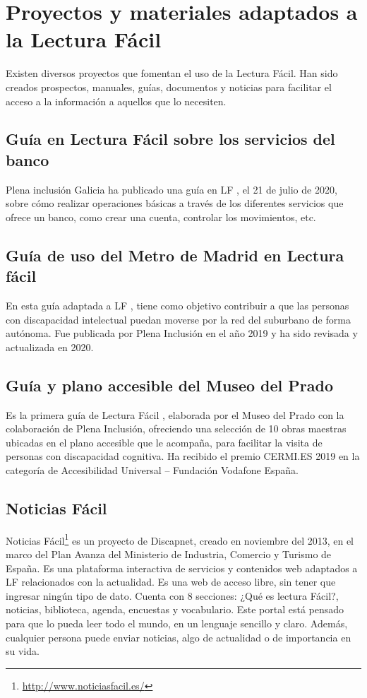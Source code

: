 \section{Proyectos y materiales adaptados a la Lectura Fácil}

Existen diversos proyectos que fomentan el uso de la Lectura Fácil. Han sido creados prospectos, manuales, guías, documentos y noticias para facilitar el acceso a la información a aquellos que lo necesiten. 


\subsection{Guía en Lectura Fácil sobre los servicios del banco}



Plena inclusión Galicia ha publicado una guía en LF \citep{GuiaBanco}, el 21 de julio de 2020, sobre cómo realizar operaciones básicas a través de los diferentes servicios que ofrece un banco, como crear una cuenta, controlar los movimientos, etc.

\subsection{Guía de uso del Metro de Madrid en Lectura fácil}


En esta guía adaptada a LF \citep{GuiaMetro}, tiene como objetivo contribuir a que las personas con discapacidad intelectual puedan moverse por la red del suburbano de forma autónoma. Fue publicada por Plena Inclusión en el año 2019 y ha sido revisada y actualizada en 2020. 

\subsection{Guía y plano accesible del Museo del Prado} 
Es la primera guía  de Lectura Fácil \citep{GuiaMuseo}, elaborada por el Museo del Prado con la colaboración de Plena Inclusión, ofreciendo una selección de 10 obras maestras ubicadas en el plano accesible \citep{plano} que le acompaña, para facilitar la visita de personas con discapacidad cognitiva. Ha recibido el premio CERMI.ES 2019 en la categoría de Accesibilidad Universal – Fundación Vodafone España.

\subsection{{Noticias Fácil} }
Noticias Fácil\footnote{\href{http://www.noticiasfacil.es/}{http://www.noticiasfacil.es/}} es un proyecto de Discapnet, creado en noviembre del 2013, en el marco del Plan Avanza del Ministerio de Industria, Comercio y Turismo de España. Es una plataforma interactiva de servicios y contenidos web adaptados a LF relacionados con la actualidad. Es una web de acceso libre, sin tener que ingresar ningún tipo de dato. Cuenta con 8 secciones: ¿Qué es lectura Fácil?, noticias, biblioteca, agenda, encuestas y vocabulario. Este portal está pensado para que lo pueda leer todo el mundo, en un lenguaje sencillo y claro. Además, cualquier persona puede enviar noticias, algo de actualidad o de importancia en su vida.

